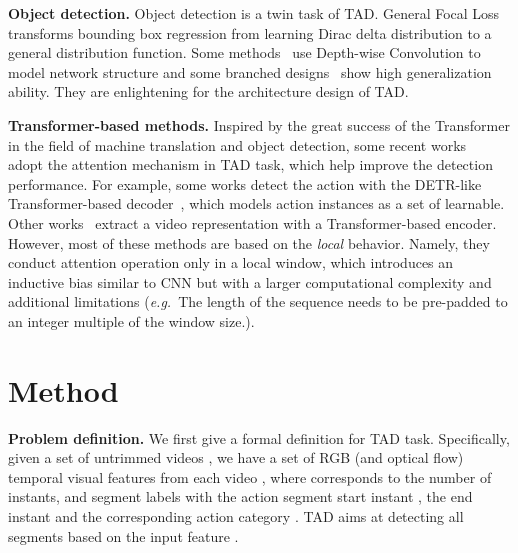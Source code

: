 \documentclass[10pt,twocolumn,letterpaper]{article}
\def\eg{{\em e.g.}}
\newcommand{\myPara}[1]{\vspace{.05in}\noindent\textbf{#1}}
\begin{document}
\myPara{Object detection.}
Object detection is a twin task of TAD. General Focal Loss~\cite{li2020generalized} transforms bounding box regression from learning Dirac delta distribution to a general distribution function. Some methods~\cite{howard2017mobilenets,chollet2017xception,liu2022convnet} use Depth-wise Convolution to model network structure and some branched designs~\cite{szegedy2017inception,hu2018squeeze} show high generalization ability. They are enlightening for the architecture design of TAD.

\myPara{Transformer-based methods.}
Inspired by the great success of the Transformer in the field of machine translation and object detection, some recent  works~\cite{zhang2022actionformer, shi2022react, tan2021relaxed, cheng2022tallformer,liu2022end,liu2022empirical} adopt the attention mechanism in TAD task, which help improve the detection performance. For example, some works\cite{tan2021relaxed,shi2022react,liu2022end} detect the action with the DETR-like Transformer-based decoder~\cite{carion2020end}, which models action instances as a set of learnable. Other works~\cite{zhang2022actionformer,cheng2022tallformer} extract a video representation with a Transformer-based encoder. However, most of these methods are based on the \emph{local} behavior. Namely, they conduct attention operation only in a local window, which introduces an inductive bias similar to CNN but with a larger computational complexity and additional limitations (\eg~The length of the sequence needs to be pre-padded to an integer multiple of the window size.). 


\section{Method}
\myPara{Problem definition.} We first give a formal definition for TAD task. Specifically, given a set of untrimmed videos , we have a set of RGB (and optical flow) temporal visual features  from each video , where  corresponds to the number of instants, and  segment labels  with the action segment start instant , the end instant  and the corresponding action category . TAD aims at detecting all segments  based on the input feature . 
\end{document}
